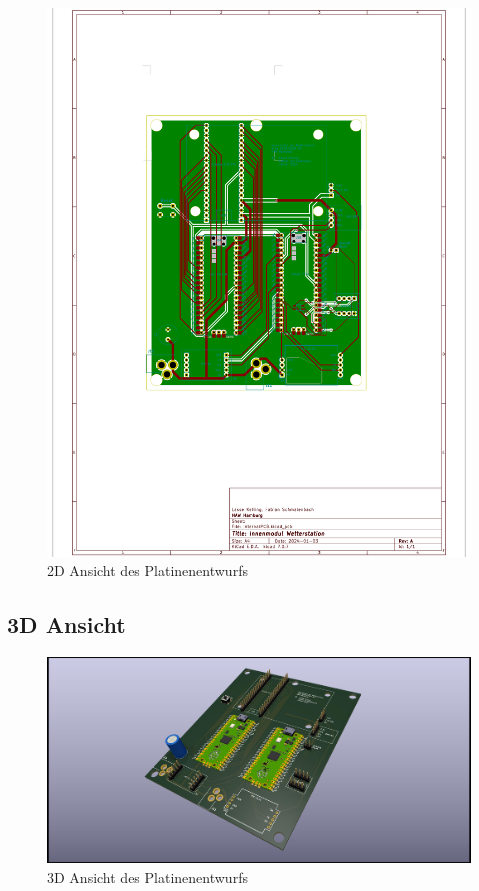 \documentclass[a4paper,11pt]{article}
\begin{document}
\begin{figure}[H]
  \centering
  \includegraphics[scale=0.7, page=1]{PCBIntern.pdf}
  \caption{2D Ansicht des Platinenentwurfs}
  \label{pdf:platineIntern}
\end{figure}

\newpage
\subsection{3D Ansicht}

\begin{figure}[H]
  \centering
  \includegraphics[width=\textwidth]{InternalPCB3D.jpg}
  \caption{3D Ansicht des Platinenentwurfs}
  \label{fig:platineIntern3D}
\end{figure}
\end{document}
